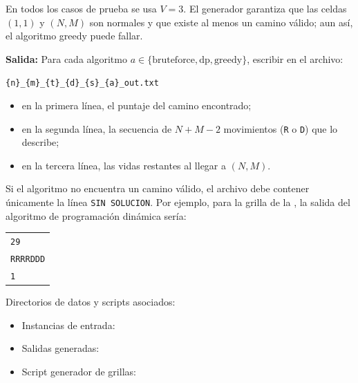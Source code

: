 En todos los casos de prueba se usa $V = 3$. El generador garantiza que las celdas $(1,1)$ y $(N,M)$ son normales y que existe al menos un camino válido; aun así, el algoritmo greedy puede fallar.

\textbf{Salida:} Para cada algoritmo $a \in \{\text{bruteforce}, \text{dp}, \text{greedy}\}$, escribir en el archivo:

\verb|{n}_{m}_{t}_{d}_{s}_{a}_out.txt|


\begin{itemize}
  \item en la primera línea, el puntaje del camino encontrado;
  \item en la segunda línea, la secuencia de $N+M-2$ movimientos (\texttt{R} o \texttt{D}) que lo describe;
  \item en la tercera línea, las vidas restantes al llegar a $(N,M)$.
\end{itemize}
Si el algoritmo no encuentra un camino válido, el archivo debe contener únicamente la línea \texttt{SIN SOLUCION}. Por ejemplo, para la grilla de la , la salida del algoritmo de programación dinámica sería:

\begin{center}
  \begin{tabular}{|l|}
    \hline
    \texttt{29} \\
    \texttt{RRRRDDD} \\
    \texttt{1} \\
    \hline
  \end{tabular}
\end{center}

Directorios de datos y scripts asociados:
\begin{itemize}
  \item Instancias de entrada: 
  \item Salidas generadas: 
  \item Script generador de grillas: 
\end{itemize}
